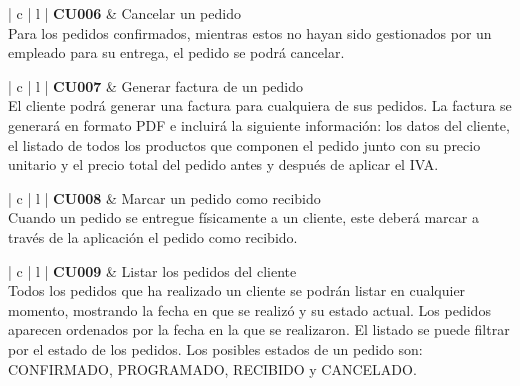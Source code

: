 \documentclass[11pt,spanish,listoffigures]{tfgetsinf}
\begin{document}
\begin{center}
\begin{tabular}{ | c | l | }
\hline
\textbf{ CU006 } & Cancelar un pedido \\
\hline
{}
{
Para los pedidos confirmados, mientras estos no hayan sido gestionados por un empleado para su entrega, el pedido se podrá cancelar.
} \\
\hline
\end{tabular}
\end{center}

\begin{center}
\begin{tabular}{ | c | l | }
\hline
\textbf{ CU007 } & Generar factura de un pedido \\
\hline
{}
{
El cliente podrá generar una factura para cualquiera de sus pedidos. La factura se generará en formato PDF e incluirá la siguiente información: los datos del cliente, el listado de todos los productos que componen el pedido junto con su precio unitario y el precio total del pedido antes y después de aplicar el IVA.
} \\
\hline
\end{tabular}
\end{center}

\begin{center}
\begin{tabular}{ | c | l | }
\hline
\textbf{ CU008 } & Marcar un pedido como recibido \\
\hline
{}
{
Cuando un pedido se entregue físicamente a un cliente, este deberá marcar a través de la aplicación el pedido como recibido.
} \\
\hline
\end{tabular}
\end{center}

\begin{center}
\begin{tabular}{ | c | l | }
\hline
\textbf{ CU009 } & Listar los pedidos del cliente \\
\hline
{}
{
Todos los pedidos que ha realizado un cliente se podrán listar en cualquier momento, mostrando la fecha en que se realizó y su estado actual. Los pedidos aparecen ordenados por la fecha en la que se realizaron. El listado se puede filtrar por el estado de los pedidos. Los posibles estados de un pedido son: CONFIRMADO, PROGRAMADO, RECIBIDO y CANCELADO.
} \\
\hline
\end{tabular}
\end{center}
\end{document}
